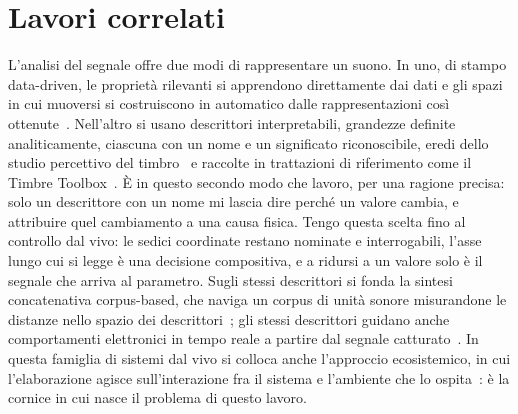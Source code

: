 \documentclass{article}
\begin{document}
\section{Lavori correlati}\label{sec:correlati}
L'analisi del segnale offre due modi di rappresentare un suono. In uno, di stampo data-driven, le proprietà rilevanti si apprendono direttamente dai dati e gli spazi in cui muoversi si costruiscono in automatico dalle rappresentazioni così ottenute~\cite{roma2019adaptive}. Nell'altro si usano descrittori interpretabili, grandezze definite analiticamente, ciascuna con un nome e un significato riconoscibile, eredi dello studio percettivo del timbro~\cite{mcadams1995perceptual} e raccolte in trattazioni di riferimento come il Timbre Toolbox~\cite{peeters2004largeset,peeters2011timbre,lerch2023introduction}. È in questo secondo modo che lavoro, per una ragione precisa: solo un descrittore con un nome mi lascia dire perché un valore cambia, e attribuire quel cambiamento a una causa fisica. Tengo questa scelta fino al controllo dal vivo: le sedici coordinate restano nominate e interrogabili, l'asse lungo cui si legge è una decisione compositiva, e a ridursi a un valore solo è il segnale che arriva al parametro. Sugli stessi descrittori si fonda la sintesi concatenativa corpus-based, che naviga un corpus di unità sonore misurandone le distanze nello spazio dei descrittori~\cite{schwarz2006catart}; gli stessi descrittori guidano anche comportamenti elettronici in tempo reale a partire dal segnale catturato~\cite{park2004towards,bullock2008implementing}. In questa famiglia di sistemi dal vivo si colloca anche l'approccio ecosistemico, in cui l'elaborazione agisce sull'interazione fra il sistema e l'ambiente che lo ospita~\cite{discipio2003sound}: è la cornice in cui nasce il problema di questo lavoro.
\end{document}
